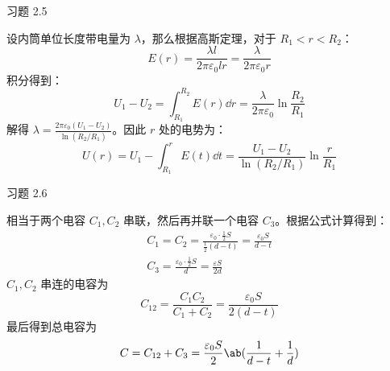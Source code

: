 \begin{problem}
	习题 2.5
	\begin{solution}
		设内筒单位长度带电量为 $\lambda$，那么根据高斯定理，对于 $R_1 < r < R_2$：
		$$
		E(r) = \frac{\lambda l}{2 \pi \varepsilon_0 l r} = \frac{\lambda}{2 \pi \varepsilon_0 r}
		$$
		积分得到：
		$$
		U_1 - U_2 = \int_{R_1}^{R_2} E(r) \dd{r} = \frac{\lambda}{2\pi \varepsilon_0} \ln \frac{R_2}{R_1}
		$$
		解得 $\lambda = \frac{2 \pi \varepsilon_0 (U_1 - U_2)}{\ln (R_2 / R_1)}$。因此 $r$ 处的电势为：
		$$
		U(r) = U_1 - \int_{R_1}^{r} E(t) \dd{t} = \frac{U_1 - U_2}{\ln (R_2 / R_1)} \ln \frac{r}{R_1}
		$$
	\end{solution}
\end{problem}

\begin{problem}
	习题 2.6
	\begin{solution}
		相当于两个电容 $C_1, C_2$ 串联，然后再并联一个电容 $C_3$。根据公式计算得到：
		$$
		\begin{gathered}
			C_1 = C_2 = \frac{\varepsilon_0 \cdot \frac{1}{2} S}{\frac{1}{2} (d - t)} = \frac{\varepsilon_0 S}{d - t} \\
			C_3 = \frac{\varepsilon_0 \cdot \frac{1}{2}S}{d} = \frac{\varepsilon S}{2d}
		\end{gathered}
		$$
		$C_1, C_2$ 串连的电容为
		$$
		C_{12} = \frac{C_1 C_2}{C_1 + C_2} = \frac{\varepsilon_0 S}{2(d - t)}
		$$
		最后得到总电容为
		$$
		C = C_{12} + C_3 = \frac{\varepsilon_0 S}{2} \ab(\frac{1}{d - t} + \frac{1}{d})
		$$
	\end{solution}
\end{problem}

